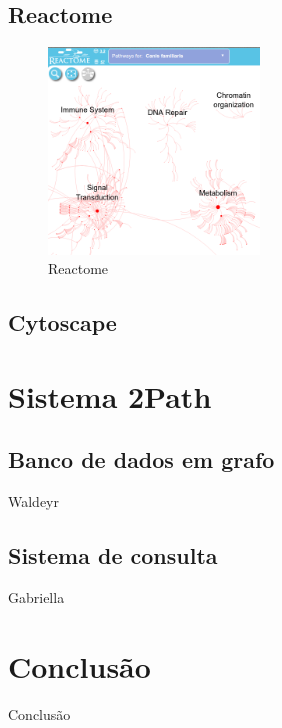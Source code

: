 \documentclass[conference]{IEEEtran}
\begin{document}
\subsection{Reactome}

\begin{figure}[!t]
\centering
\includegraphics[width=0.5\textwidth]{reactome_canis_small.png}
\caption{Reactome}
\label{reactome_canis_small}
\end{figure}



\subsection{Cytoscape}





\section{Sistema 2Path}

\subsection{Banco de dados em grafo}

Waldeyr

\subsection{Sistema de consulta}

Gabriella

\section{Conclusão}

Conclusão
\end{document}
